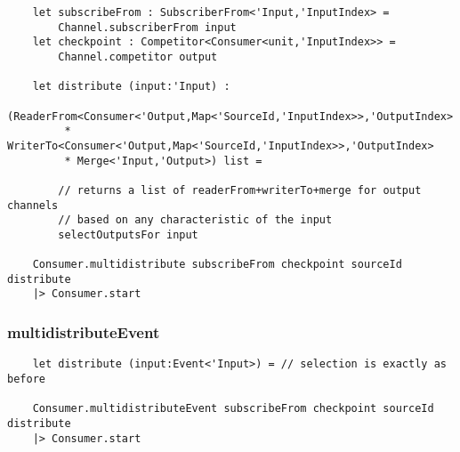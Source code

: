 \documentclass{article}
\begin{document}
\begin{verbatim}
    let subscribeFrom : SubscriberFrom<'Input,'InputIndex> =
        Channel.subscriberFrom input
    let checkpoint : Competitor<Consumer<unit,'InputIndex>> =
        Channel.competitor output
    
    let distribute (input:'Input) :
        (ReaderFrom<Consumer<'Output,Map<'SourceId,'InputIndex>>,'OutputIndex>
         * WriterTo<Consumer<'Output,Map<'SourceId,'InputIndex>>,'OutputIndex>
         * Merge<'Input,'Output>) list =
        
        // returns a list of readerFrom+writerTo+merge for output channels
        // based on any characteristic of the input
        selectOutputsFor input
        
    Consumer.multidistribute subscribeFrom checkpoint sourceId distribute
    |> Consumer.start
\end{verbatim}

\subsubsection{multidistributeEvent}

\begin{verbatim}
    let distribute (input:Event<'Input>) = // selection is exactly as before
    
    Consumer.multidistributeEvent subscribeFrom checkpoint sourceId distribute
    |> Consumer.start
\end{verbatim}






\end{document}

